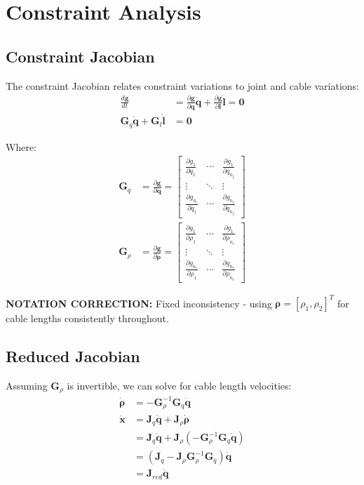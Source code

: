 \documentclass[11pt,a4paper]{article}
\begin{document}
\section{Constraint Analysis}

\subsection{Constraint Jacobian}
The constraint Jacobian relates constraint variations to joint and cable variations:
\begin{align}
\frac{d\bm{g}}{dt} &= \frac{\partial \bm{g}}{\partial \bm{q}} \dot{\bm{q}} + \frac{\partial \bm{g}}{\partial \bm{l}} \dot{\bm{l}} = \bm{0} \\
\bm{G}_q \dot{\bm{q}} + \bm{G}_l \dot{\bm{l}} &= \bm{0}
\end{align}

Where:
\begin{align}
\bm{G}_q &= \frac{\partial \bm{g}}{\partial \bm{q}} = \begin{bmatrix}
\frac{\partial g_1}{\partial q_1} & \cdots & \frac{\partial g_1}{\partial q_{n_j}} \\
\vdots & \ddots & \vdots \\
\frac{\partial g_{n_c}}{\partial q_1} & \cdots & \frac{\partial g_{n_c}}{\partial q_{n_j}}
\end{bmatrix} \\
\bm{G}_{\rho} &= \frac{\partial \bm{g}}{\partial \bm{\rho}} = \begin{bmatrix}
\frac{\partial g_1}{\partial \rho_1} & \cdots & \frac{\partial g_1}{\partial \rho_{n_c}} \\
\vdots & \ddots & \vdots \\
\frac{\partial g_{n_c}}{\partial \rho_1} & \cdots & \frac{\partial g_{n_c}}{\partial \rho_{n_c}}
\end{bmatrix}
\end{align}

\textbf{NOTATION CORRECTION:} Fixed inconsistency - using $\bm{\rho} = [\rho_1, \rho_2]^T$ for cable lengths consistently throughout.

\subsection{Reduced Jacobian}
Assuming $\bm{G}_{\rho}$ is invertible, we can solve for cable length velocities:
\begin{align}
\dot{\bm{\rho}} &= -\bm{G}_{\rho}^{-1} \bm{G}_q \dot{\bm{q}} \\
\dot{\bm{x}} &= \bm{J}_q \dot{\bm{q}} + \bm{J}_{\rho} \dot{\bm{\rho}} \\
&= \bm{J}_q \dot{\bm{q}} + \bm{J}_{\rho} (-\bm{G}_{\rho}^{-1} \bm{G}_q \dot{\bm{q}}) \\
&= (\bm{J}_q - \bm{J}_{\rho} \bm{G}_{\rho}^{-1} \bm{G}_q) \dot{\bm{q}} \\
&= \bm{J}_{red} \dot{\bm{q}}
\end{align}
\end{document}
